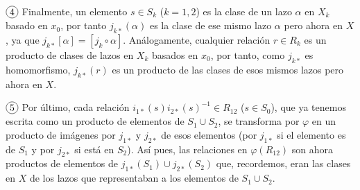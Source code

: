 \documentclass[GTS.tex]{subfiles}
\begin{document}
$\circled{4}$ Finalmente, un elemento $s\in S_k$ ($k=1,2$) es la clase de un lazo $\alpha$ en $X_k$ basado en $x_0$, por tanto $j_{k*}(\alpha)$ es la clase de ese mismo lazo $\alpha$ pero ahora en $X$, ya que  $j_{k*}[\alpha]=[j_k\circ\alpha]$. Análogamente, cualquier relación $r\in R_k$ es un producto de clases de lazos en $X_k$ basados en $x_0$, por tanto, como $j_{k*}$ es homomorfismo, $j_{k*}(r)$ es un producto de las clases de esos mismos lazos pero ahora en $X$.

$\circled{5}$ Por último, cada relación $i_{1*}(s)i_{2*}(s)^{-1}\in R_{12}$ ($s\in S_0$), que ya tenemos escrita como un producto de elementos de $S_1\cup S_2$, se transforma por $\varphi$ en un producto de imágenes por $j_{1*}$ y $j_{2*}$ de esos elementos (por $j_{1*}$ si el elemento es de $S_1$ y por $j_{2*}$ si está en $S_2$). Así pues, las relaciones en $\varphi(R_{12})$ son ahora productos de elementos de $j_{1*}(S_1)\cup j_{2*}(S_2)$ que, recordemos, eran las clases en $X$ de los lazos que representaban a los elementos de $S_1\cup S_2$.
\end{document}
